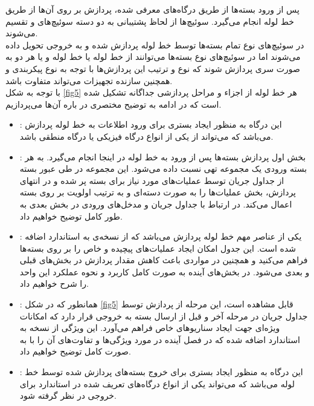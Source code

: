 پس از ورود بسته‌ها از طریق درگاه‌های معرفی شده، پردازش بر روی آن‌ها از طریق خط لوله انجام می‌گیرد. سوئیچ‌ها از لحاظ پشتیبانی  به دو دسته سوئیچ‌های  و  تقسیم می‌شوند.\\
در سوئیچ‌های نوع  تمام بسته‌ها توسط خط لوله  پردازش شده و به خروجی تحویل داده می‌شوند اما در سوئیچ‌های نوع  بسته‌ها می‌توانند از خط لوله  یا خط لوله  و یا هر دو به صورت سری پردازش شوند که نوع و ترتیب این پردازش‌ها با توجه به نوع پیکربندی و همچنین سازنده تجهیزات می‌تواند متفاوت باشد.\\
با توجه به شکل \ref{fig5} هر خط لوله از اجزاء و مراحل پردازشی جداگانه تشکیل شده است که در ادامه به توضیح مختصری در باره آن‌ها می‌پردازیم. 
\begin{itemize}
	\item {}:
این درگاه به منظور ایجاد بستری برای ورود اطلاعات به خط لوله پردازش می‌باشد که می‌تواند از یکی از انواع درگاه فیزیکی یا درگاه منطقی باشد.

	\item {}:
بخش اول پردازش بسته‌ها پس از ورود به خط لوله در اینجا انجام می‌گیرد. به هر بسته ورودی یک مجموعه تهی  نسبت داده می‌شود. این مجموعه در طی عبور بسته از جداول جریان توسط عملیات‌های مورد نیاز برای بسته پر شده و در انتهای پردازش، بخش  عملیات‌ها را به صورت دسته‌ای و به ترتیب اولویت بر روی بسته اعمال می‌کند. در ارتباط با جداول جریان و مدخل‌های ورودی در بخش بعدی به طور کامل توضیح خواهیم داد.

	\item {}:
یکی از عناصر مهم خط لوله پردازش می‌باشد که از نسخه‌ی  به استاندارد اضافه شده است. این جدول امکان ایجاد عملیات‌های پیچیده و خاص را بر روی بسته‌ها فراهم می‌کنید و همچنین در مواردی باعث کاهش مقدار پردازش در بخش‌های قبلی و بعدی می‌شود. در بخش‌های آینده به صورت کامل کاربرد و نحوه عملکرد این واحد را شرح خواهیم داد.

	\item {}:
همانطور که در شکل \ref{fig5} قابل مشاهده است، این مرحله از پردازش توسط جداول جریان در مرحله آخر و قبل از ارسال بسته به خروجی قرار دارد که امکانات ویژه‌ای جهت ایجاد سناریو‌های خاص فراهم می‌آورد. این ویژگی از نسخه  به استاندارد اضافه شده که در فصل آینده در مورد ویژگی‌ها و تفاوت‌های آن را با  به صورت کامل توضیح خواهیم داد.

	\item {}:
این درگاه به منظور ایجاد بستری برای خروج بسته‌های پردازش شده توسط خط لوله می‌باشد که می‌تواند یکی از انواع درگاه‌های تعریف شده در استاندارد برای خروجی در نظر گرفته شود.

\end{itemize}

